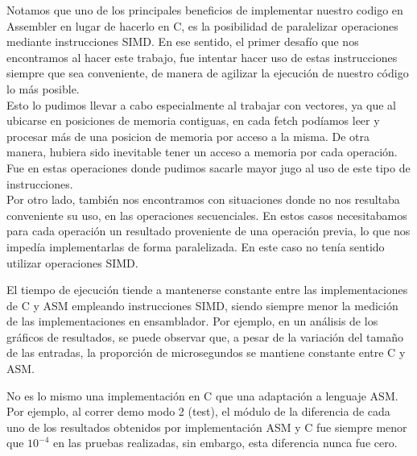 \par 
Notamos que uno de los principales beneficios de implementar nuestro codigo en Assembler en lugar de hacerlo en C, es la posibilidad de paralelizar operaciones mediante instrucciones SIMD.
En ese sentido, el primer desafío que nos encontramos al hacer este trabajo, fue intentar hacer uso de estas instrucciones siempre que sea conveniente, de manera de agilizar la ejecución de nuestro código lo más posible.\\
Esto lo pudimos llevar a cabo especialmente al trabajar con vectores, ya que al ubicarse en posiciones de memoria contiguas, en cada fetch podíamos leer y procesar más de una posicion de memoria por acceso a la misma. De otra manera, hubiera sido inevitable tener un acceso a memoria por cada operación. Fue en estas operaciones donde pudimos sacarle mayor jugo al uso de este tipo de instrucciones.\\
Por otro lado, también nos encontramos con situaciones donde no nos resultaba conveniente su uso, en las operaciones secuenciales.
En estos casos necesitabamos para cada operación un resultado proveniente de una operación previa, lo que nos impedía implementarlas de forma paralelizada. En este caso no tenía sentido utilizar operaciones SIMD.%


\par El tiempo de ejecución tiende a mantenerse constante entre las implementaciones de C y ASM empleando instrucciones SIMD, siendo siempre menor la medición de las implementaciones en ensamblador.
Por ejemplo, en un análisis de los gráficos de resultados, se puede observar que, a pesar de la variación del tamaño de las entradas, la proporción de microsegundos se mantiene constante entre C y ASM.%

\par No es lo mismo una implementación en C que una adaptación a lenguaje ASM. Por ejemplo, al correr demo modo 2 (test), el módulo de la diferencia de cada uno de los resultados obtenidos por implementación ASM y C fue siempre menor que $10^{-4}$ en las pruebas realizadas, sin embargo, esta diferencia nunca fue cero.%



